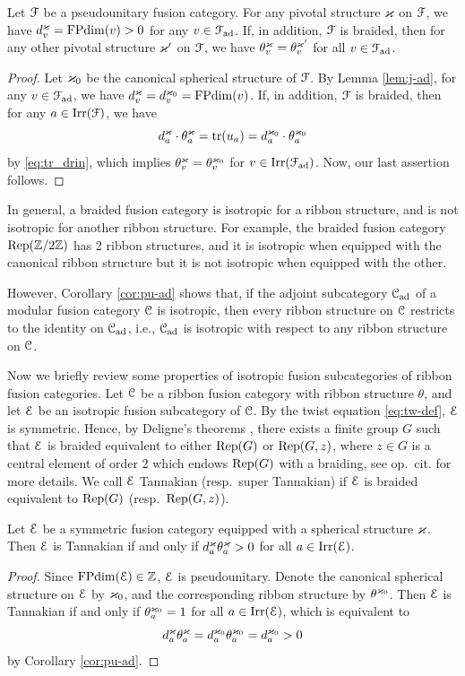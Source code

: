 \documentclass[11pt]{article}
\begin{document}
\begin{cor}\label{cor:pu-ad}
Let ${\mathcal{F}}$ be a pseudounitary fusion category. For any pivotal structure $\varkappa$ on $\mathcal{F}$, we have $d^\varkappa_v = \operatorname{FPdim}(v)>0$ for any $v \in \mathcal{F}_{\operatorname{ad}}$. If, in addition,  $\mathcal{F}$ is braided, then for any other pivotal structure $\varkappa'$ on ${\mathcal{F}}$, we have $\theta^{\varkappa}_v = \theta^{\varkappa'}_v$ for all $v \in {\mathcal{F}}_{{\operatorname{ad}}}$.
\end{cor}
\begin{proof}
Let $\varkappa_0$ be the canonical spherical structure of ${\mathcal{F}}$. By Lemma \ref{lem:j-ad}, for any $v \in \mathcal{F}_{\operatorname{ad}}$, we have $d^\varkappa_v = d^{\varkappa_{0}}_v = \operatorname{FPdim}(v)$. If, in addition, $\mathcal{F}$ is braided, then  for any $a \in {\operatorname{Irr}}({\mathcal{F}})$, we have
\[
d^{\varkappa}_a \cdot \theta^{\varkappa}_{a}  ={\operatorname{tr}}(u_a) = d^{\varkappa_0}_a \cdot \theta^{\varkappa_0}_{a}
\]
by \eqref{eq:tr_drin}, which implies $\theta^{\varkappa}_{v} = \theta^{\varkappa_0}_v$ for $v \in {\operatorname{Irr}}({\mathcal{F}}_{\operatorname{ad}})$. Now, our last assertion follows.
\end{proof}

In general,  a braided fusion category is isotropic for a ribbon structure, and is not isotropic for another ribbon structure. For example, the braided fusion category ${\operatorname{Rep}}({\mathbb{Z}}/2{\mathbb{Z}})$ has 2 ribbon structures, and it is isotropic when equipped with the canonical ribbon structure but it is not isotropic when equipped with the other.

However, Corollary \ref{cor:pu-ad} shows that, if the adjoint subcategory $\mathcal{C}_{{\operatorname{ad}}}$ of a modular fusion category $\mathcal{C}$ is isotropic, then every ribbon structure on $\mathcal{C}$ restricts to the identity on $\mathcal{C}_{{\operatorname{ad}}}$, i.e., $\mathcal{C}_{{\operatorname{ad}}}$ is isotropic with respect to any ribbon structure on $\mathcal{C}$.

Now we briefly review some properties of isotropic fusion subcategories of ribbon fusion categories. Let $\mathcal{C}$ be a ribbon fusion category with ribbon structure $\theta$, and let $\mathcal{E}$ be an isotropic fusion subcategory of $\mathcal{C}$. By the twist equation \eqref{eq:tw-def}, $\mathcal{E}$ is symmetric. Hence, by Deligne's theorems \cite{Del02}, there exists a finite group $G$ such that $\mathcal{E}$ is braided equivalent to either ${\operatorname{Rep}}(G)$ or ${\operatorname{Rep}}(G, z)$, where $z \in G$ is a central element of order 2 which endows  ${\operatorname{Rep}}(G)$ with a braiding, see op.~cit. for more details. 
We call $\mathcal{E}$ Tannakian (resp.~super Tannakian) if $\mathcal{E}$ is braided equivalent to ${\operatorname{Rep}}(G)$ (resp.~${\operatorname{Rep}}(G, z)$). 
 
\begin{lemma} \label{cor:Tan_cri}
Let $\mathcal{E}$ be a symmetric fusion category equipped with a spherical structure $\varkappa$. Then $\mathcal{E}$ is Tannakian if and only if $d_a^\varkappa \theta_a^\varkappa > 0$ for all $a \in {\operatorname{Irr}}(\mathcal{E})$.
\end{lemma}
\begin{proof}
Since $\operatorname{FPdim}(\mathcal{E})\in {\mathbb{Z}}$, $\mathcal{E}$ is pseudounitary. Denote the canonical spherical structure on $\mathcal{E}$ by $\varkappa_0$, and the corresponding ribbon structure by $\theta^{\varkappa_0}$. Then $\mathcal{E}$ is Tannakian if and only if $\theta_a^{\varkappa_0} = 1$ for all $a \in {\operatorname{Irr}}(\mathcal{E})$, which is equivalent to
$$
d_a^\varkappa \theta_a^\varkappa = d_a^{\varkappa_0} \theta_a^{\varkappa_0} = d_a^{\varkappa_0} > 0
$$
by Corollary \ref{cor:pu-ad}.
\end{proof}
\end{document}
